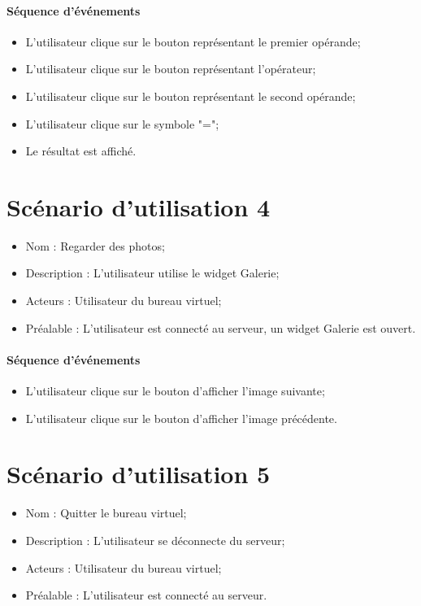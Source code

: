 \paragraph{Séquence d'événements}
\begin{itemize}
	\item L'utilisateur clique sur le bouton représentant le premier opérande;
	\item L'utilisateur clique sur le bouton représentant l'opérateur;
	\item L'utilisateur clique sur le bouton représentant le second opérande;
	\item L'utilisateur clique sur le symbole "=";
	\item Le résultat est affiché.
\end{itemize}



\section{Scénario d'utilisation 4}
\begin{itemize}
	\item Nom : Regarder des photos;
	\item Description : L'utilisateur utilise le widget Galerie;
	\item Acteurs : Utilisateur du bureau virtuel;
	\item Préalable : L'utilisateur est connecté au serveur, un widget Galerie est ouvert.
\end{itemize}

\paragraph{Séquence d'événements}
\begin{itemize}
	\item L'utilisateur clique sur le bouton d'afficher l'image suivante;
	\item L'utilisateur clique sur le bouton d'afficher l'image précédente.
\end{itemize}



\section{Scénario d'utilisation 5}
\begin{itemize}
	\item Nom : Quitter le bureau virtuel;
	\item Description : L'utilisateur se déconnecte du serveur;
	\item Acteurs : Utilisateur du bureau virtuel;
	\item Préalable : L'utilisateur est connecté  au serveur.
\end{itemize}

